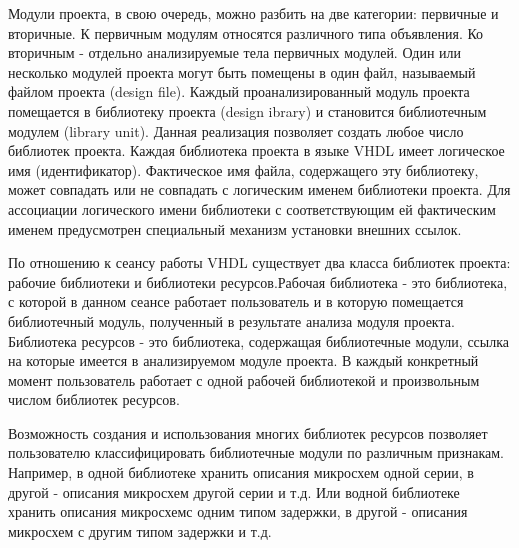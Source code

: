 Модули проекта, в свою очередь, можно разбить на две категории: первичные и вторичные. К первичным модулям относятся различного типа объявления. Ко вторичным  -  отдельно анализируемые тела первичных модулей. Один или несколько модулей проекта могут быть помещены в один файл, называемый файлом проекта (design file). Каждый проанализированный модуль проекта помещается в библиотеку проекта (design ibrary) и становится библиотечным модулем (library unit). Данная реализация позволяет создать любое число библиотек проекта. Каждая библиотека проекта в языке  VHDL имеет логическое имя (идентификатор). Фактическое имя файла, содержащего эту библиотеку, может совпадать или не совпадать с логическим именем библиотеки проекта. Для ассоциации логического имени библиотеки с соответствующим ей фактическим именем предусмотрен специальный механизм установки внешних ссылок.

По отношению к сеансу работы  VHDL существует два класса библиотек проекта: рабочие библиотеки и библиотеки ресурсов.Рабочая библиотека  -  это библиотека, с которой в данном сеансе работает пользователь и в которую помещается библиотечный модуль, полученный в результате анализа модуля проекта. Библиотека ресурсов  -  это библиотека, содержащая библиотечные модули, ссылка на которые имеется в анализируемом модуле проекта. В каждый конкретный момент пользователь работает с одной рабочей библиотекой и произвольным числом библиотек ресурсов.

Возможность создания и использования многих библиотек ресурсов позволяет пользователю классифицировать библиотечные модули по различным признакам. Например, в одной библиотеке хранить описания микросхем одной серии, в другой  -  описания микросхем другой серии и т.д.    Или водной библиотеке хранить описания микросхемс одним типом задержки,  в другой  -  описания микросхем с другим типом задержки и т.д.
